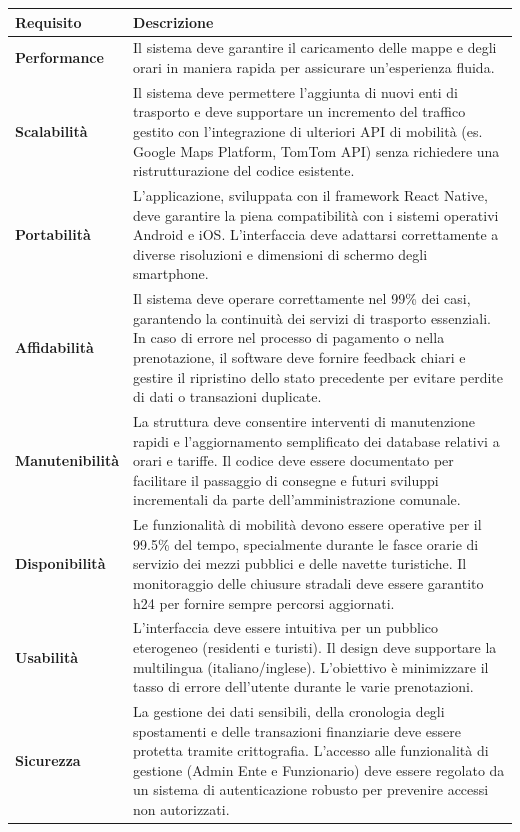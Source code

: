 \begin{table}[h!]
\centering
\small
\renewcommand{\arraystretch}{1.5}
\begin{tabularx}{\textwidth}{|l|X|}
\hline
\textbf{Requisito} & \textbf{Descrizione} \\ \hline
\textbf{Performance} & Il sistema deve garantire il caricamento delle mappe e degli orari in maniera rapida per assicurare un'esperienza fluida. \\ \hline

\textbf{Scalabilità} & Il sistema deve permettere l'aggiunta di nuovi enti di trasporto e deve supportare un incremento del traffico gestito con l'integrazione di ulteriori API di mobilità (es. Google Maps Platform, TomTom API) senza richiedere una ristrutturazione del codice esistente. \\ \hline

\textbf{Portabilità} & L'applicazione, sviluppata con il framework React Native, deve garantire la piena compatibilità con i sistemi operativi Android e iOS. L'interfaccia deve adattarsi correttamente a diverse risoluzioni e dimensioni di schermo degli smartphone. \\ \hline

\textbf{Affidabilità} & Il sistema deve operare correttamente nel 99\% dei casi, garantendo la continuità dei servizi di trasporto essenziali. In caso di errore nel processo di pagamento o nella prenotazione, il software deve fornire feedback chiari e gestire il ripristino dello stato precedente per evitare perdite di dati o transazioni duplicate. \\ \hline

\textbf{Manutenibilità} & La struttura deve consentire interventi di manutenzione rapidi e l'aggiornamento semplificato dei database relativi a orari e tariffe. Il codice deve essere documentato per facilitare il passaggio di consegne e futuri sviluppi incrementali da parte dell'amministrazione comunale. \\ \hline

\textbf{Disponibilità} & Le funzionalità di mobilità devono essere operative per il 99.5\% del tempo, specialmente durante le fasce orarie di servizio dei mezzi pubblici e delle navette turistiche. Il monitoraggio delle chiusure stradali deve essere garantito h24 per fornire sempre percorsi aggiornati. \\ \hline

\textbf{Usabilità} & L'interfaccia deve essere intuitiva per un pubblico eterogeneo (residenti e turisti). Il design deve supportare la multilingua (italiano/inglese). L'obiettivo è minimizzare il tasso di errore dell'utente durante le varie  prenotazioni. \\ \hline

\textbf{Sicurezza} & La gestione dei dati sensibili, della cronologia degli spostamenti e delle transazioni finanziarie deve essere protetta tramite crittografia. L'accesso alle funzionalità di gestione (Admin Ente e Funzionario) deve essere regolato da un sistema di autenticazione robusto per prevenire accessi non autorizzati. \\ \hline
\end{tabularx}
\end{table}